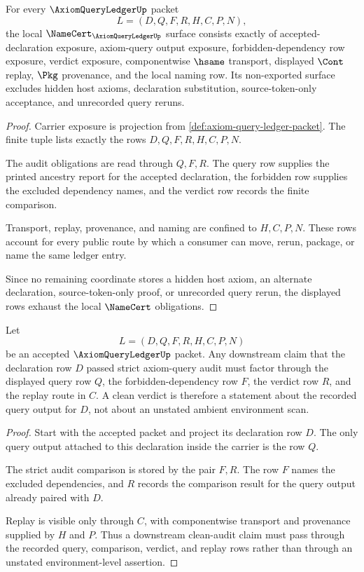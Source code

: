 \begin{theorem}
\label{thm:axiom-query-ledger-obligations}
For every $\AxiomQueryLedgerUp$ packet
$$
L=(D,Q,F,R,H,C,P,N),
$$
the local $\NameCert_{\AxiomQueryLedgerUp}$ surface consists exactly of accepted-declaration exposure, axiom-query output exposure, forbidden-dependency row exposure, verdict exposure, componentwise $\hsame$ transport, displayed $\Cont$ replay, $\Pkg$ provenance, and the local naming row. Its non-exported surface excludes hidden host axioms, declaration substitution, source-token-only acceptance, and unrecorded query reruns.
\end{theorem}
\begin{proof}
Carrier exposure is projection from \autoref{def:axiom-query-ledger-packet}. The finite tuple lists exactly the rows $D,Q,F,R,H,C,P,N$.

The audit obligations are read through $Q,F,R$. The query row supplies the printed ancestry report for the accepted declaration, the forbidden row supplies the excluded dependency names, and the verdict row records the finite comparison.

Transport, replay, provenance, and naming are confined to $H,C,P,N$. These rows account for every public route by which a consumer can move, rerun, package, or name the same ledger entry.

Since no remaining coordinate stores a hidden host axiom, an alternate declaration, source-token-only proof, or unrecorded query rerun, the displayed rows exhaust the local $\NameCert$ obligations.
\end{proof}

\begin{theorem}
\label{thm:axiom-query-ledger-query-soundness}
Let
$$
L=(D,Q,F,R,H,C,P,N)
$$
be an accepted $\AxiomQueryLedgerUp$ packet. Any downstream claim that the declaration row $D$ passed strict axiom-query audit must factor through the displayed query row $Q$, the forbidden-dependency row $F$, the verdict row $R$, and the replay route in $C$. A clean verdict is therefore a statement about the recorded query output for $D$, not about an unstated ambient environment scan.
\end{theorem}
\begin{proof}
Start with the accepted packet and project its declaration row $D$. The only query output attached to this declaration inside the carrier is the row $Q$.

The strict audit comparison is stored by the pair $F,R$. The row $F$ names the excluded dependencies, and $R$ records the comparison result for the query output already paired with $D$.

Replay is visible only through $C$, with componentwise transport and provenance supplied by $H$ and $P$. Thus a downstream clean-audit claim must pass through the recorded query, comparison, verdict, and replay rows rather than through an unstated environment-level assertion.
\end{proof}

